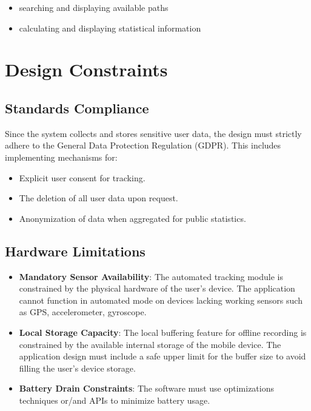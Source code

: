 \begin{itemize}
    \item searching and displaying available paths
    \item calculating and displaying statistical information
\end{itemize}

\section{Design Constraints}
\label{sec:constraints}

\subsection{Standards Compliance}

Since the system collects and stores sensitive user data, the design must strictly adhere to the General Data Protection Regulation (GDPR). This includes implementing mechanisms for:
\begin{itemize}
    \item Explicit user consent for tracking.
    \item The deletion of all user data upon request.
    \item Anonymization of data when aggregated for public statistics.
\end{itemize}

\subsection{Hardware Limitations}

\begin{itemize}
    \item \textbf{Mandatory Sensor Availability}: The automated tracking module is constrained by the physical hardware of the user's device. The application cannot function in automated mode on devices lacking working sensors such as GPS, accelerometer, gyroscope.

    \item \textbf{Local Storage Capacity}: The local buffering feature for offline recording is constrained by the available internal storage of the mobile device. The application design must include a safe upper limit for the buffer size to avoid filling the user's device storage.

    \item \textbf{Battery Drain Constraints}: The software must use optimizations techniques or/and APIs to minimize battery usage.
\end{itemize}

